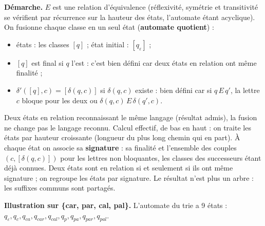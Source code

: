 \documentclass[11pt,a4paper]{article}
\providecommand{\tightlist}{\setlength{\itemsep}{0pt}\setlength{\parskip}{0pt}}
\begin{document}
\textbf{Démarche.} \(E\) est une relation d'équivalence (réflexivité, symétrie et transitivité se vérifient par récurrence sur la hauteur des états, l'automate étant acyclique). On fusionne chaque classe en un seul état (\textbf{automate quotient}) :

\begin{itemize}
\tightlist
\item
  états : les classes \([q]\) ; état initial : \([q_\varepsilon]\) ;
\item
  \([q]\) est final si \(q\) l'est : c'est bien défini car deux états en relation ont même finalité ;
\item
  \(\delta'([q], c) = [\delta(q, c)]\) si \(\delta(q, c)\) existe : bien défini car si \(q\,E\,q'\), la lettre \(c\) bloque pour les deux ou \(\delta(q, c)\, E\, \delta(q', c)\).
\end{itemize}

Deux états en relation reconnaissant le même langage (résultat admis), la fusion ne change pas le langage reconnu. Calcul effectif, de bas en haut : on traite les états par hauteur croissante (longueur du plus long chemin qui en part). À chaque état on associe sa \textbf{signature} : sa finalité et l'ensemble des couples \((c, [\delta(q, c)])\) pour les lettres non bloquantes, les classes des successeurs étant déjà connues. Deux états sont en relation si et seulement si ils ont même signature ; on regroupe les états par signature. Le résultat n'est plus un arbre : les suffixes communs sont partagés.

\textbf{Illustration sur \{car, par, cal, pal\}.} L'automate du trie a 9 états : \(q_\varepsilon,\allowbreak q_c,\allowbreak q_{ca},\allowbreak q_{car},\allowbreak q_{cal},\allowbreak q_p,\allowbreak q_{pa},\allowbreak q_{par},\allowbreak q_{pal}\).
\end{document}

